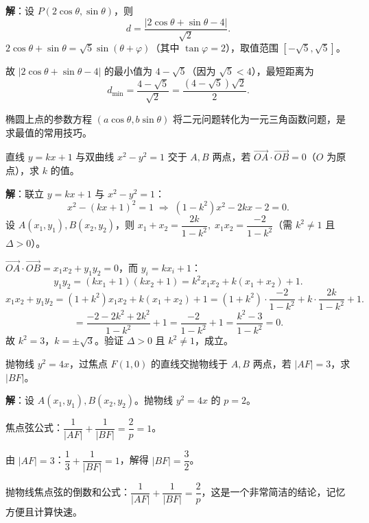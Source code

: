 \documentclass[12pt, a4paper]{ctexart}
\begin{document}
\noindent\textbf{解}：设 $P(2\cos\theta,\sin\theta)$，则
\[
  d=\frac{|2\cos\theta+\sin\theta-4|}{\sqrt{2}}.
\]
$2\cos\theta+\sin\theta=\sqrt{5}\sin(\theta+\varphi)$（其中 $\tan\varphi=2$），取值范围 $[-\sqrt{5},\sqrt{5}]$。

故 $|2\cos\theta+\sin\theta-4|$ 的最小值为 $4-\sqrt{5}$（因为 $\sqrt{5}<4$），最短距离为
\[
  d_{\min}=\frac{4-\sqrt{5}}{\sqrt{2}}=\frac{(4-\sqrt{5})\sqrt{2}}{2}.
\]

\begin{tipbox}[方法总结]
椭圆上点的参数方程 $(a\cos\theta,b\sin\theta)$ 将二元问题转化为一元三角函数问题，是求最值的常用技巧。
\end{tipbox}

\vspace{6pt}

\begin{examplebox}
直线 $y=kx+1$ 与双曲线 $x^2-y^2=1$ 交于 $A,B$ 两点，若 $\overrightarrow{OA}\cdot\overrightarrow{OB}=0$（$O$ 为原点），求 $k$ 的值。
\end{examplebox}

\noindent\textbf{解}：联立 $y=kx+1$ 与 $x^2-y^2=1$：
\[
  x^2-(kx+1)^2=1\;\Longrightarrow\;(1-k^2)x^2-2kx-2=0.
\]
设 $A(x_1,y_1),B(x_2,y_2)$，则 $x_1+x_2=\dfrac{2k}{1-k^2},\;x_1x_2=\dfrac{-2}{1-k^2}$（需 $k^2\neq1$ 且 $\Delta>0$）。

$\overrightarrow{OA}\cdot\overrightarrow{OB}=x_1x_2+y_1y_2=0$，而 $y_i=kx_i+1$：
\[
  y_1y_2=(kx_1+1)(kx_2+1)=k^2x_1x_2+k(x_1+x_2)+1.
\]
\[
  x_1x_2+y_1y_2=(1+k^2)x_1x_2+k(x_1+x_2)+1=(1+k^2)\cdot\frac{-2}{1-k^2}+k\cdot\frac{2k}{1-k^2}+1.
\]
\[
  =\frac{-2-2k^2+2k^2}{1-k^2}+1=\frac{-2}{1-k^2}+1=\frac{k^2-3}{1-k^2}=0.
\]
故 $k^2=3$，$k=\pm\sqrt{3}$。验证 $\Delta>0$ 且 $k^2\neq1$，成立。

\vspace{6pt}

\begin{examplebox}[【例题9】抛物线焦点弦问题]
抛物线 $y^2=4x$，过焦点 $F(1,0)$ 的直线交抛物线于 $A,B$ 两点，若 $|AF|=3$，求 $|BF|$。
\end{examplebox}

\noindent\textbf{解}：设 $A(x_1,y_1),B(x_2,y_2)$。抛物线 $y^2=4x$ 的 $p=2$。

焦点弦公式：$\dfrac{1}{|AF|}+\dfrac{1}{|BF|}=\dfrac{2}{p}=1$。

由 $|AF|=3$：$\dfrac{1}{3}+\dfrac{1}{|BF|}=1$，解得 $|BF|=\dfrac{3}{2}$。

\begin{tipbox}[规律总结]
抛物线焦点弦的倒数和公式：$\dfrac{1}{|AF|}+\dfrac{1}{|BF|}=\dfrac{2}{p}$，这是一个非常简洁的结论，记忆方便且计算快速。
\end{tipbox}
\end{document}

